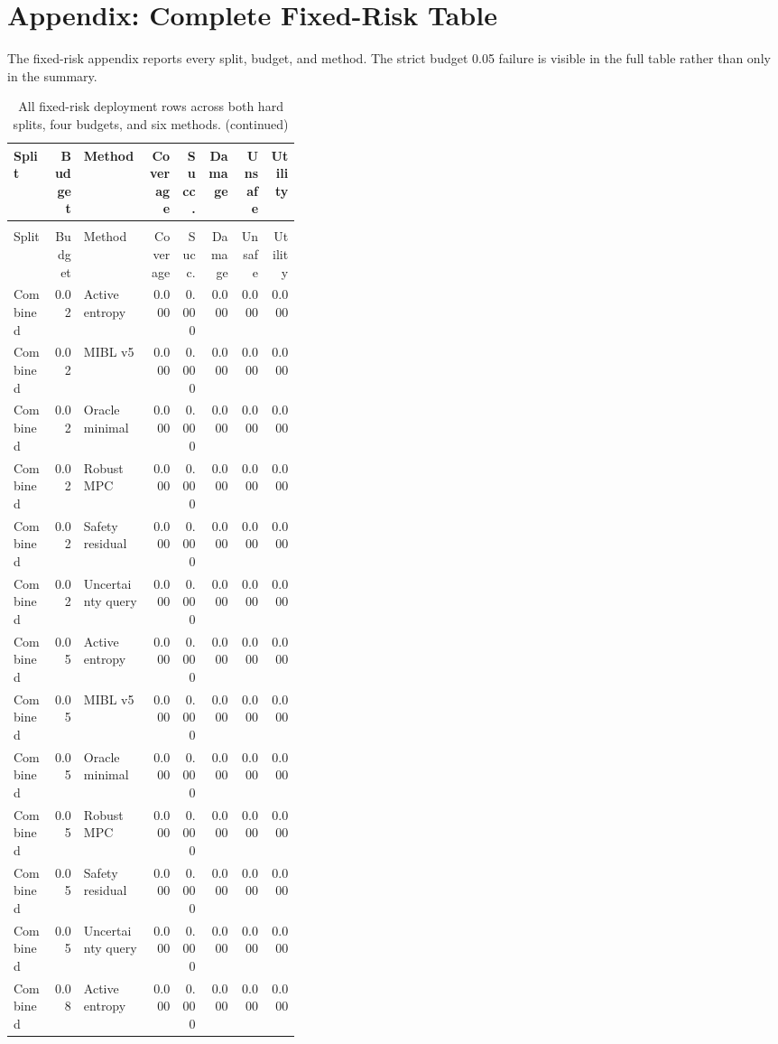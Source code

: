 \documentclass{article}
\begin{document}
\section{Appendix: Complete Fixed-Risk Table}
The fixed-risk appendix reports every split, budget, and method. The strict budget 0.05 failure is visible in the full table rather than only in the summary.
\begin{center}
\tiny
\begin{longtable}{p{0.14\linewidth}rp{0.23\linewidth}rrrrr}
\caption{All fixed-risk deployment rows across both hard splits, four budgets, and six methods.}\label{tab:full-fixed}\\
\toprule
Split & Budget & Method & Coverage & Succ. & Damage & Unsafe & Utility\\
\midrule
\endfirsthead
\caption[]{All fixed-risk deployment rows across both hard splits, four budgets, and six methods. (continued)}\\
\toprule
Split & Budget & Method & Coverage & Succ. & Damage & Unsafe & Utility\\
\midrule
\endhead
Combined & 0.02 & Active entropy & 0.000 & 0.000 & 0.000 & 0.000 & 0.000\\
Combined & 0.02 & MIBL v5 & 0.000 & 0.000 & 0.000 & 0.000 & 0.000\\
Combined & 0.02 & Oracle minimal & 0.000 & 0.000 & 0.000 & 0.000 & 0.000\\
Combined & 0.02 & Robust MPC & 0.000 & 0.000 & 0.000 & 0.000 & 0.000\\
Combined & 0.02 & Safety residual & 0.000 & 0.000 & 0.000 & 0.000 & 0.000\\
Combined & 0.02 & Uncertainty query & 0.000 & 0.000 & 0.000 & 0.000 & 0.000\\
Combined & 0.05 & Active entropy & 0.000 & 0.000 & 0.000 & 0.000 & 0.000\\
Combined & 0.05 & MIBL v5 & 0.000 & 0.000 & 0.000 & 0.000 & 0.000\\
Combined & 0.05 & Oracle minimal & 0.000 & 0.000 & 0.000 & 0.000 & 0.000\\
Combined & 0.05 & Robust MPC & 0.000 & 0.000 & 0.000 & 0.000 & 0.000\\
Combined & 0.05 & Safety residual & 0.000 & 0.000 & 0.000 & 0.000 & 0.000\\
Combined & 0.05 & Uncertainty query & 0.000 & 0.000 & 0.000 & 0.000 & 0.000\\
Combined & 0.08 & Active entropy & 0.000 & 0.000 & 0.000 & 0.000 & 0.000\\

\end{longtable}
\end{center}
\end{document}
